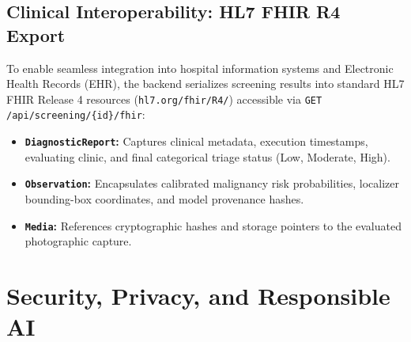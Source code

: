 \documentclass[11pt,a4paper]{report}
\newcommand{\artifact}[1]{\nolinkurl{#1}}
\begin{document}
\section{Clinical Interoperability: HL7 FHIR R4 Export}
To enable seamless integration into hospital information systems and Electronic Health Records (EHR), the backend serializes screening results into standard HL7 FHIR Release 4 resources (\artifact{hl7.org/fhir/R4/}) accessible via \texttt{GET /api/screening/\{id\}/fhir}:
\begin{itemize}
  \item \textbf{\texttt{DiagnosticReport}:} Captures clinical metadata, execution timestamps, evaluating clinic, and final categorical triage status (Low, Moderate, High).
  \item \textbf{\texttt{Observation}:} Encapsulates calibrated malignancy risk probabilities, localizer bounding-box coordinates, and model provenance hashes.
  \item \textbf{\texttt{Media}:} References cryptographic hashes and storage pointers to the evaluated photographic capture.
\end{itemize}

\chapter{Security, Privacy, and Responsible AI}
\end{document}
